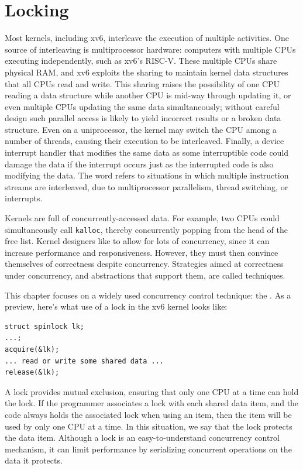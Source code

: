 \chapter{Locking}
\label{CH:LOCK}

Most kernels, including xv6, interleave the execution
of multiple activities.
One source of interleaving is multiprocessor hardware:
computers with
multiple CPUs executing independently, such as xv6's RISC-V.
These multiple CPUs share physical RAM,
and xv6 exploits the sharing to maintain kernel
data structures that all CPUs read and write.
This sharing raises the possibility of
one CPU reading a data structure while another
CPU is mid-way through updating it, or even
multiple CPUs updating the same data simultaneously;
without careful design such parallel access is likely
to yield incorrect results or a broken data structure.
Even on a uniprocessor, the kernel may switch the CPU among
a number of threads, causing their execution to be interleaved.
Finally, a device interrupt handler that modifies
the same data as some interruptible code could damage
the data if the interrupt occurs just as the interrupted code is
also modifying the data.
The word 
refers to situations in which
multiple instruction streams are interleaved,
due to multiprocessor parallelism,
thread switching, or interrupts.

Kernels are full of concurrently-accessed data. For example, two CPUs
could simultaneously call {\tt kalloc}, thereby concurrently
popping from the head of the free list. Kernel designers like to allow
for lots of concurrency, since it can increase performance
and responsiveness. However, they must then
convince themselves of
correctness despite concurrency.
Strategies
aimed at correctness under concurrency, and abstractions that support
them, are called  techniques.

This chapter focuses on a widely
used concurrency control technique: the .
As a preview, here's what use of a lock in the xv6 kernel looks like:
\begin{lstlisting}
struct spinlock lk;
...;
acquire(&lk);
... read or write some shared data ...
release(&lk);
\end{lstlisting}

A lock provides mutual
exclusion, ensuring that only one CPU at a time can hold the lock. If
the programmer associates a lock with each shared data item, and the
code always holds the associated lock when using an item, then the
item will be used by only one CPU at a time.  In this situation, we
say that the lock protects the data item.  Although a lock is an
easy-to-understand concurrency control mechanism, 
it can limit performance by serializing
concurrent operations on the data it protects.

